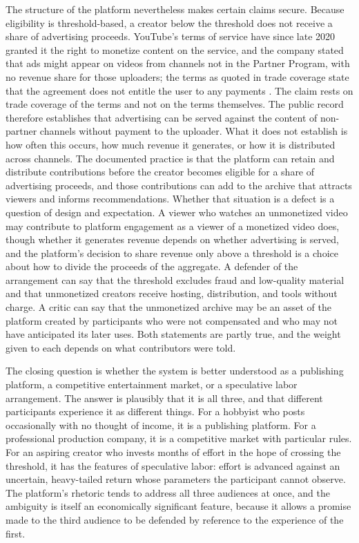 \documentclass[11pt]{article}
\theoremstyle{remark}
\begin{document}
The structure of the platform nevertheless makes certain claims secure. Because eligibility is threshold-based, a creator below the threshold does not receive a share of advertising proceeds. YouTube's terms of service have since late 2020 granted it the right to monetize content on the service, and the company stated that ads might appear on videos from channels not in the Partner Program, with no revenue share for those uploaders; the terms as quoted in trade coverage state that the agreement does not entitle the user to any payments \cite{mediapost2020}. The claim rests on trade coverage of the terms and not on the terms themselves. The public record therefore establishes that advertising can be served against the content of non-partner channels without payment to the uploader. What it does not establish is how often this occurs, how much revenue it generates, or how it is distributed across channels. The documented practice is that the platform can retain and distribute contributions before the creator becomes eligible for a share of advertising proceeds, and those contributions can add to the archive that attracts viewers and informs recommendations. Whether that situation is a defect is a question of design and expectation. A viewer who watches an unmonetized video may contribute to platform engagement as a viewer of a monetized video does, though whether it generates revenue depends on whether advertising is served, and the platform's decision to share revenue only above a threshold is a choice about how to divide the proceeds of the aggregate. A defender of the arrangement can say that the threshold excludes fraud and low-quality material and that unmonetized creators receive hosting, distribution, and tools without charge. A critic can say that the unmonetized archive may be an asset of the platform created by participants who were not compensated and who may not have anticipated its later uses. Both statements are partly true, and the weight given to each depends on what contributors were told.

The closing question is whether the system is better understood as a publishing platform, a competitive entertainment market, or a speculative labor arrangement. The answer is plausibly that it is all three, and that different participants experience it as different things. For a hobbyist who posts occasionally with no thought of income, it is a publishing platform. For a professional production company, it is a competitive market with particular rules. For an aspiring creator who invests months of effort in the hope of crossing the threshold, it has the features of speculative labor: effort is advanced against an uncertain, heavy-tailed return whose parameters the participant cannot observe. The platform's rhetoric tends to address all three audiences at once, and the ambiguity is itself an economically significant feature, because it allows a promise made to the third audience to be defended by reference to the experience of the first.
\end{document}

